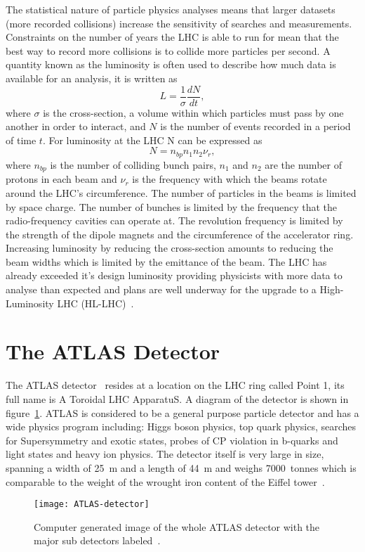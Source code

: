 The statistical nature of particle physics analyses means that larger datasets
(more recorded collisions) increase the sensitivity of searches and
measurements. Constraints on the number of years the LHC is able to run for mean
that the best way to record more collisions is to collide more particles per
second. A quantity known as the luminosity is often used to describe how much
data is available for an analysis, it is written as
\begin{equation}
  \label{eq:luminosity}
  L = \frac{1}{\sigma}\frac{dN}{dt},
\end{equation}
where $\sigma$ is the cross-section, a volume within which particles must pass
by one another in order to interact, and $N$ is the number of events recorded in
a period of time $t$. For luminosity at the LHC N can be expressed as
\begin{equation}
  \label{eq:lhc-lumi}
  N = n_{bp}n_{1}n_{2}\nu_{r},
\end{equation}
where $n_{bp}$ is the number of colliding bunch pairs, $n_{1}$ and $n_{2}$ are
the number of protons in each beam and $\nu_r$ is the frequency with which the
beams rotate around the LHC's circumference. The number of particles in the
beams is limited by space charge. The number of bunches is limited by the
frequency that the radio-frequency cavities can operate at. The revolution
frequency is limited by the strength of the dipole magnets and the circumference
of the accelerator ring. Increasing luminosity by reducing the cross-section
amounts to reducing the beam widths which is limited by the emittance of the
beam. The LHC has already exceeded it's design luminosity providing physicists
with more data to analyse than expected and plans are well underway for the
upgrade to a High-Luminosity LHC (HL-LHC)~\cite{hilumi-tdr}.

\section{The ATLAS Detector}%
\label{sec:atlas}

The ATLAS detector~\cite{ATLAS} resides at a location on the LHC ring called
Point 1, its full name is A Toroidal LHC ApparatuS. A diagram of the detector is
shown in figure~\ref{fig:ATLAS-det}. ATLAS is considered to be a general purpose
particle detector and has a wide physics program including: Higgs boson physics,
top quark physics, searches for Supersymmetry and exotic states, probes of CP
violation in b-quarks and light states and heavy ion physics. The detector
itself is very large in size, spanning a width of 25~m and a length of 44~m and
weighs 7000~tonnes which is comparable to the weight of the wrought iron content
of the Eiffel tower~\cite{Eiffel-weight}.
\begin{figure}[ht]
  \centering
  \texttt{[image: ATLAS-detector]}
  \caption[The ATLAS Detector]{Computer generated image of the whole ATLAS
    detector with the major sub detectors labeled~\cite{ATLAS-det-fig}.}%
  \label{fig:ATLAS-det}
\end{figure}


